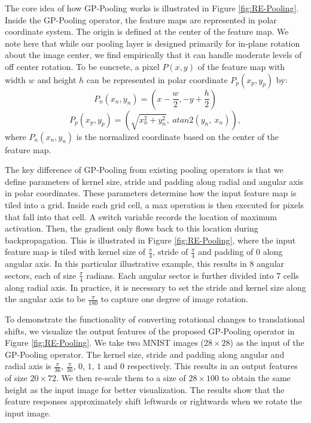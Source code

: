 \documentclass[10pt,twocolumn,letterpaper]{article}
\begin{document}
The core idea of how GP-Pooling works is illustrated in Figure \ref{fig:RE-Pooling}. Inside the GP-Pooling operator, the feature maps are represented in polar coordinate system. The origin is defined at the center of the feature map. We note here that while our pooling layer is designed primarily for in-plane rotation about the image center, we find empirically that it can handle moderate levels of off center rotation. To be concrete, a pixel $P(x, y)$ of the feature map with width $w$ and height $h$ can be represented in polar coordinate $P_p(x_p, y_p)$ by:
\vspace{-0.3cm}
\begin{equation}
    P_n(x_n, y_n) = (x - \frac{w}{2}, -y + \frac{h}{2})    
\end{equation}
\vspace{-0.4cm}
\begin{equation}
    P_p(x_p, y_p) = (\sqrt{x_n^2 + y_n^2}, \ atan2(y_n, \ x_n)),
\end{equation}
where $P_n(x_n, y_n)$ is the normalized coordinate based on the center of the feature map.

The key difference of GP-Pooling from existing pooling operators is that we define parameters of kernel size, stride and padding along radial and angular axis in polar coordinates. These parameters determine how the input feature map is tiled into a grid. Inside each grid cell, a max operation is then executed for pixels that fall into that cell. A switch variable records the location of maximum activation. Then, the gradient only flows back to this location during backpropagation. This is illustrated in Figure \ref{fig:RE-Pooling}, where the input feature map is tiled with kernel size of $\frac{\pi}{4}$, stride of $\frac{\pi}{4}$ and padding of $0$ along angular axis. In this particular illustrative example, this results in 8 angular sectors, each of size $\frac{\pi}{4}$ radians. Each angular sector is further divided into 7 cells along radial axis. In practice, it is necessary to set the stride and kernel size along the angular axis to be $\frac{\pi}{180}$ to capture one degree of image rotation.

To demonstrate the functionality of converting rotational changes to translational shifts, we visualize the output features of the proposed GP-Pooling operator in Figure \ref{fig:RE-Pooling}. We take two MNIST images ($28 \times 28$) as the input of the GP-Pooling operator. The kernel size, stride and padding along angular and radial axis is $\frac{\pi}{36}$, $\frac{\pi}{36}$, $0$, $1$, $1$ and $0$ respectively. This results in an output features of size $20 \times 72$. We then re-scale them to a size of $28 \times 100$ to obtain the same height as the input image for better visualization. The results show that the feature responses approximately shift leftwards or rightwards when we rotate the input image.
\end{document}
